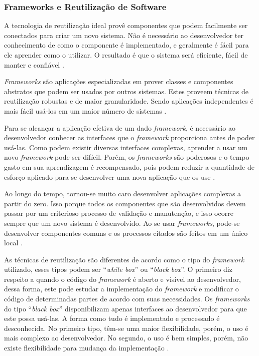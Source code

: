 \subsubsection{Frameworks e Reutilização de Software}

A tecnologia de reutilização ideal provê componentes que podem facilmente ser conectados para criar um novo sistema. Não é necessário ao desenvolvedor ter conhecimento de como o componente é implementado, e geralmente é fácil para ele aprender como o utilizar. O resultado é que o sistema será eficiente, fácil de manter e confiável \cite{Johnson:1997}.

\textit{Frameworks} são aplicações especializadas em prover classes e componentes abstratos que podem ser usados por outros sistemas. Estes proveem técnicas de reutilização robustas e de maior granularidade. Sendo aplicações independentes é mais fácil usá-los em um maior número de sistemas \cite{Johnson:Foote:1988}.

Para se alcançar a aplicação efetiva de um dado \textit{framework}, é necessário ao desenvolvedor conhecer as interfaces que o \textit{framework} proporciona antes de poder usá-las. Como podem existir diversas interfaces complexas, aprender a usar um novo \textit{framework} pode ser difícil. Porém, os \textit{frameworks} são poderosos e o tempo gasto em sua aprendizagem é recompensado, pois podem reduzir a quantidade de esforço aplicado para se desenvolver uma nova aplicação que os use \cite{Johnson:1997}.

Ao longo do tempo, tornou-se muito caro desenvolver aplicações complexas a partir do zero. Isso porque todos os componentes que são desenvolvidos devem passar por um criterioso processo de validação e manutenção, e isso ocorre sempre que um novo sistema é desenvolvido. Ao se usar \textit{frameworks}, pode-se desenvolver componentes comuns e os processos citados são feitos em um único local \cite{Fayad:Schimidt:1997}.

As técnicas de reutilização são diferentes de acordo como o tipo do \textit{framework} utilizado, esses tipos podem ser ``\textit{white box}'' ou ``\textit{black box}''. O primeiro diz respeito a quando o código do \textit{framework} é aberto e visível ao desenvolvedor, dessa forma, este pode estudar a implementação do \textit{framework} e modificar o código de determinadas partes de acordo com suas necessidades. Os \textit{frameworks} do tipo ``\textit{black box}'' disponibilizam apenas interfaces ao desenvolvedor para que este possa usá-las. A forma como tudo é implementado e processado é desconhecida. No primeiro tipo, têm-se uma maior flexibilidade, porém, o uso é mais complexo ao desenvolvedor. No segundo, o uso é bem simples, porém, não existe flexibilidade para mudança da implementação \cite{Kroth:2000}.

